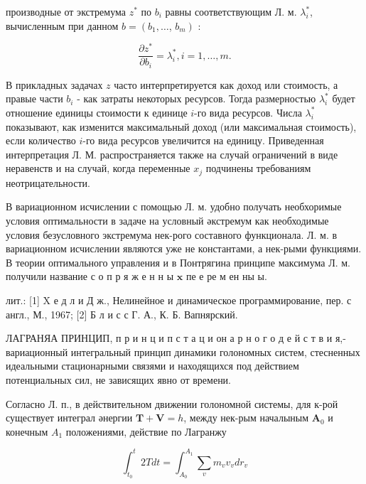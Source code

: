 \documentclass[10pt]{article}
\begin{document}
производные от экстремума $z^{*}$ по $b_{i}$ равны соответствующим Л. м. $\lambda_{i}^{*}$, вычисленным при данном $b=\left(b_{1}, \ldots\right.$, $\left.b_{m}\right)$ :



\[

\frac{\partial z^{*}}{\partial b_{i}}=\lambda_{i}^{*}, i=1, \ldots, m .

\]



В прикладных задачах $z$ часто интерпретируется как доход или стоимость, а правые части $b_{i}$ - как затраты некоторых ресурсов. Тогда размерностью $\lambda_{i}^{*}$ будет отношение единицы стоимости к единице $i$-го вида ресурсов. Числа $\lambda_{i}^{*}$ показывают, как изменится максимальный доход (или максимальная стоимость), если количество $i$-го вида ресурсов увеличится на единицу. Приведенная интерпретация Л. М. распространяется также на случай ограничений в виде неравенств и на случай, когда переменные $x_{j}$ подчинены требованиям неотрицательности.



В вариационном исчислении с помощью Л. м. удобно получать необхоримые условия оптимальности в задаче на условный әкстремум как необходимые условия безусловного экстремума нек-рого составного функционала. Л. м. в вариационном исчислении являются уже не константами, а нек-рыми функциями. В теории оптимального управления и в Понтрягина принципе максимума Л. м. получили название с о п р я ж е н н ы $\mathbf{x}$ пе е ре м ен ны ы.



лит.: [1] X е д л и Д ж., Нелинейное и динамическое программирование, пер. с англ., М., 1967; [2] Б л и с с Г. А., К. Б. Вапнярский.



ЛАГРАНЯА ПРИНЦИП, п р и н ц и п с т а ц и он а р н о г о д е й с т в и я,-вариационный интегральный принцип динамики голономных систем, стесненных идеальными стационарными связями и находящихся под действием потенциальных сил, не зависящих явно от времени.



Согласно Л. п., в действительном движении голономной системы, для к-рой существует интеграл әнергии $\boldsymbol{T}+\boldsymbol{V}=h$, между нек-рым началыным $\boldsymbol{A}_{0}$ и конечным $A_{1}$ положениями, действие по Лагранжу



\[

\int_{t_{0}}^{t} 2 T d t=\int_{A_{0}}^{A_{1}} \sum_{v} m_{v} v_{v} d r_{v}

\]
\end{document}
